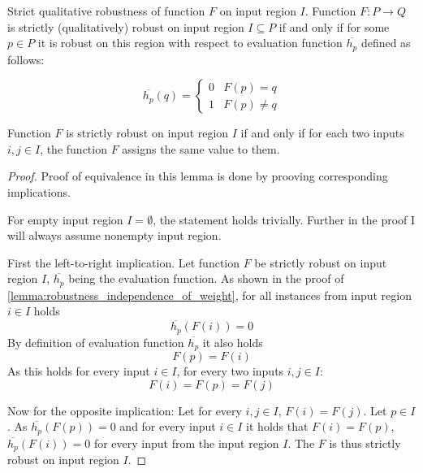 \begin{definition}{Strict qualitative robustness of function $F$ on input region $I$.}%
    \label{def:strict_robustness}
    Function $F: P\to Q$ is strictly (qualitatively) robust on input region $I\subseteq P$
    if and only if for some $p\in P$ it is robust on this region with respect
    to evaluation function $\overline{h_p}$ defined as follows:

    \begin{equation*}
        \overline{h_p}(q) = \left\{\begin{matrix}
            0 & F(p) = q\\
            1 & F(p) \neq q
        \end{matrix}\right.
    \end{equation*}
\end{definition}

\begin{lemma}{Function $F$ is strictly robust on input region $I$
    if and only if for each two inputs $i, j\in I$, the function $F$ assigns the same value to them.}
    \begin{proof}
        Proof of equivalence in this lemma is done
        by prooving corresponding implications.

        For empty input region $I=\emptyset$, the statement holds trivially.
        Further in the proof I will always assume nonempty input region.

        First the left-to-right implication.
        Let function $F$ be strictly robust on input region $I$,
        $\overline{h_p}$ being the evaluation function.
        As shown in the proof of \cref{lemma:robustness_independence_of_weight},
        for all instances from input region $i\in I$ holds
        \begin{equation*}
            \overline{h_p}(F(i)) = 0
        \end{equation*}
        By definition of evaluation function $\overline{h_p}$ it also holds
        \begin{equation*}
            F(p) = F(i)
        \end{equation*}
        As this holds for every input $i\in I$, for every two inputs $i, j\in I$:
        \begin{equation*}
            F(i) = F(p) = F(j)
        \end{equation*}

        Now for the opposite implication: Let for every $i, j\in I$, $F(i) = F(j)$.
        Let $p\in I$. As $\overline{h_p}(F(p)) = 0$
        and for every input $i\in I$ it holds that $F(i) = F(p)$,
        $\overline{h_p}(F(i)) = 0$ for every input from the input region $I$.
        The $F$ is thus strictly robust on input region $I$.
    \end{proof}
\end{lemma}

